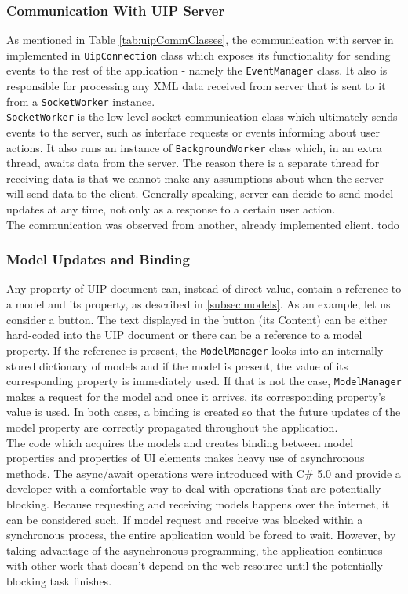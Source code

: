\subsubsection{Communication With UIP Server}
As mentioned in Table \ref{tab:uipCommClasses}, the communication with server in implemented in \texttt{UipConnection} class which exposes its functionality for sending events to the rest of the application - namely the \texttt{EventManager} class. It also is responsible for processing any XML data received from server that is sent to it from a \texttt{SocketWorker} instance.
\\
\texttt{SocketWorker} is the low-level socket communication class which ultimately sends events to the server, such as interface requests or events informing about user actions. It also runs an instance of \texttt{BackgroundWorker} class which, in an extra thread, awaits data from the server. The reason there is a separate thread for receiving data is that we cannot make any assumptions about when the server will send data to the client. Generally speaking, server can decide to send model updates at any time, not only as a response to a certain user action.\\
The communication was observed from another, already implemented client. todo

\subsubsection{Model Updates and Binding}
Any property of UIP document can, instead of direct value, contain a reference to a model and its property, as described in \ref{subsec:models}. As an example, let us consider a button. The text displayed in the button (its Content) can be either hard-coded into the UIP document or there can be a reference to a model property. If the reference is present, the \texttt{ModelManager} looks into an internally stored dictionary of models and if the model is present, the value of its corresponding property is immediately used. If that is not the case, \texttt{ModelManager} makes a request for the model and once it arrives, its corresponding property's value is used. In both cases, a binding is created so that the future updates of the model property are correctly propagated throughout the application.\\The code which acquires the models and creates binding between model properties and properties of UI elements makes heavy use of asynchronous methods. The async/await operations were introduced with C\# 5.0  and provide a developer with a comfortable way to deal with operations that are potentially blocking. Because requesting and receiving models happens over the internet, it can be considered such. If model request and receive was blocked within a synchronous process, the entire application would be forced to wait. However, by taking advantage of the asynchronous programming, the application continues with other work that doesn't depend on the web resource until the potentially blocking task finishes.

